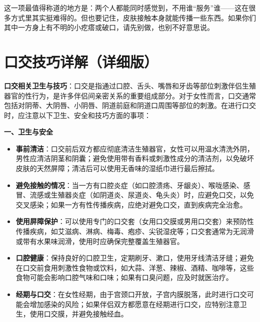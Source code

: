 \documentclass[12pt,UTF8]{ctexbook}
\begin{document}
\begin{tcolorbox}[colback=pink!5!white,colframe=red!50!black,title=贴心小叮咛]
这一项最值得称道的地方是：两个人都能同时感觉到，不用谁“服务”谁——这在很多方式里其实挺难得的。但也要记住，皮肤接触本身就能传播一些东西。如果你们其中一方身上有不明的小疙瘩或破口，请先别做，也别不好意思说。
\end{tcolorbox}


\section{口交技巧详解（详细版）}

\textbf{口交相关卫生与技巧}：口交是指通过口腔、舌头、嘴唇和牙齿等部位刺激伴侣生殖器官的性行为，是许多伴侣间亲密关系的重要组成部分。对于女性而言，口交通常包括对阴蒂、大阴唇、小阴唇、阴道前庭和阴道口周围等部位的刺激。在进行口交时，应注意以下卫生、安全和技巧方面的事项：

  \textbf{一、卫生与安全}
  \begin{itemize}
  \item \textbf{事前清洁}：口交前后双方都应彻底清洁生殖器官，女性可以用温水清洗外阴，男性应清洁阴茎和阴囊；避免使用带有香料或刺激性成分的清洁剂，以免破坏皮肤的天然屏障；清洁后可以使用无香味的湿纸巾进行最后擦拭。
  \item \textbf{避免接触的情况}：当一方有口腔炎症（如口腔溃疡、牙龈炎）、喉咙感染、感冒、流感或生殖器炎症（如阴道炎、尿道炎、龟头炎）时，应避免口交，以免交叉感染；如果一方有性传播疾病，应绝对避免口交，直到疾病完全治愈。
  \item \textbf{使用屏障保护}：可以使用专门的口交套（女用口交膜或男用口交套）来预防性传播疾病，如艾滋病、淋病、梅毒、疱疹、尖锐湿疣等；口交套通常为无润滑或带有水果味润滑，使用时应确保完整覆盖生殖器官。
  \item \textbf{口腔健康}：保持良好的口腔卫生，定期刷牙、漱口，使用牙线清洁牙缝；避免在口交前食用刺激性食物或饮料，如大蒜、洋葱、辣椒、酒精、咖啡等，这些食物可能会影响口腔气味和口味；如果有口臭问题，应及时就医治疗。
  \item \textbf{经期与口交}：在女性经期，由于宫颈口开放，子宫内膜脱落，此时进行口交可能会增加感染的风险；如果伴侣双方都愿意在经期进行口交，应特别注意卫生，使用口交膜，并避免接触经血。
  \end{itemize}
\end{document}
